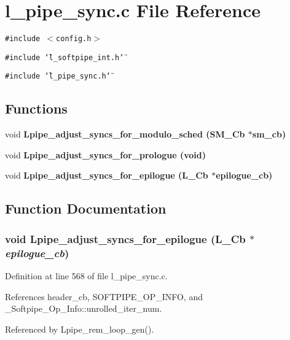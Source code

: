 \section{l\_\-pipe\_\-sync.c File Reference}
\label{l__pipe__sync_8c}
{\tt \#include $<$config.h$>$}\par
{\tt \#include \char`\"{}l\_\-softpipe\_\-int.h\char`\"{}}\par
{\tt \#include \char`\"{}l\_\-pipe\_\-sync.h\char`\"{}}\par
\subsection*{Functions}
\begin{CompactItemize}
\item 
void \bf{Lpipe\_\-adjust\_\-syncs\_\-for\_\-modulo\_\-sched} (\bf{SM\_\-Cb} $\ast$sm\_\-cb)
\item 
void \bf{Lpipe\_\-adjust\_\-syncs\_\-for\_\-prologue} (void)
\item 
void \bf{Lpipe\_\-adjust\_\-syncs\_\-for\_\-epilogue} (L\_\-Cb $\ast$epilogue\_\-cb)
\end{CompactItemize}


\subsection{Function Documentation}
\subsubsection{\setlength{\rightskip}{0pt plus 5cm}void Lpipe\_\-adjust\_\-syncs\_\-for\_\-epilogue (L\_\-Cb $\ast$ {\em epilogue\_\-cb})}\label{l__pipe__sync_8c_a2557b5b8cba1b69a2ea00f31d0788c9}




Definition at line 568 of file l\_\-pipe\_\-sync.c.

References header\_\-cb, SOFTPIPE\_\-OP\_\-INFO, and \_\-Softpipe\_\-Op\_\-Info::unrolled\_\-iter\_\-num.

Referenced by Lpipe\_\-rem\_\-loop\_\-gen().
